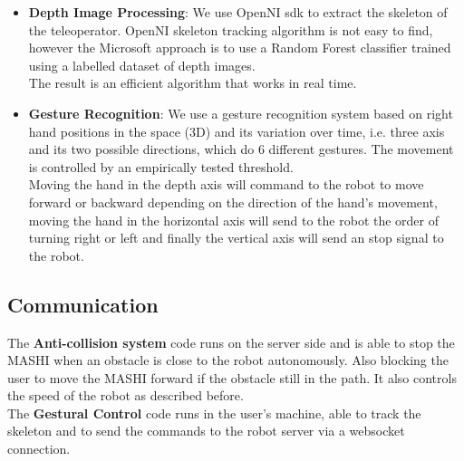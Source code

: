 \begin{itemize}
	\item \textbf{Depth Image Processing}: We use OpenNI sdk to extract the skeleton of the teleoperator. OpenNI skeleton tracking algorithm is not easy to find, however the Microsoft approach is to use a Random Forest classifier trained using a labelled dataset of depth images. \\
	
	The result is an efficient algorithm that works in real time.
	
	\item \textbf{Gesture Recognition}: We use a gesture recognition system based on right hand positions in the space (3D) and its variation over time, i.e. three axis and its two possible directions, which do 6 different gestures. The movement is controlled by an empirically tested threshold.\\
		
	Moving the hand in the depth axis will command to the robot to move forward or backward depending on the direction of the hand's movement, moving the hand in the horizontal axis will send to the robot the order of turning right or left and finally the vertical axis will send an stop signal to the robot.
	
\end{itemize}

\subsection{Communication}

The \textbf{Anti-collision system} code runs on the server side and is able to stop the MASHI when an obstacle is close to the robot autonomously. Also blocking the user to move the MASHI forward if the obstacle still in the path. It also controls the speed of the robot as described before.\\

The \textbf{Gestural Control} code runs in the user's machine, able to track the skeleton and to send the commands to the robot server via a websocket connection.

